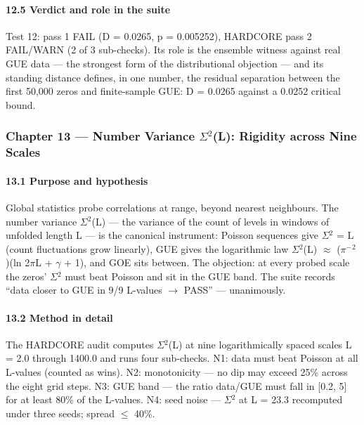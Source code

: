 \documentclass[10pt]{article}
\begin{document}
\paragraph{12.5 Verdict and role in the suite}

Test 12: pass 1 FAIL (D = 0.0265, p = 0.005252), HARDCORE pass 2 FAIL/WARN (2 of 3 sub-checks). Its role is the ensemble witness against real GUE data --- the strongest form of the distributional objection --- and its standing distance defines, in one number, the residual separation between the first 50,000 zeros and finite-sample GUE: D = 0.0265 against a 0.0252 critical bound.

\subsubsection{Chapter 13 --- Number Variance $\Sigma$$^2$(L): Rigidity across Nine Scales}

\paragraph{13.1 Purpose and hypothesis}

Global statistics probe correlations at range, beyond nearest neighbours. The number variance $\Sigma$$^2$(L) --- the variance of the count of levels in windows of unfolded length L --- is the canonical instrument: Poisson sequences give $\Sigma$$^2$ = L (count fluctuations grow linearly), GUE gives the logarithmic law $\Sigma$$^2$(L) $\approx$ ($\pi$$^-$$^2$)(ln 2$\pi$L + $\gamma$ + 1), and GOE sits between. The objection: at every probed scale the zeros' $\Sigma$$^2$ must beat Poisson and sit in the GUE band. The suite records ``data closer to GUE in 9/9 L-values $\rightarrow$ PASS'' --- unanimously.

\paragraph{13.2 Method in detail}

The HARDCORE audit computes $\Sigma$$^2$(L) at nine logarithmically spaced scales L = 2.0 through 1400.0 and runs four sub-checks. N1: data must beat Poisson at all L-values (counted as wins). N2: monotonicity --- no dip may exceed 25\% across the eight grid steps. N3: GUE band --- the ratio data/GUE must fall in [0.2, 5] for at least 80\% of the L-values. N4: seed noise --- $\Sigma$$^2$ at L = 23.3 recomputed under three seeds; spread $\le$ 40\%.
\end{document}
